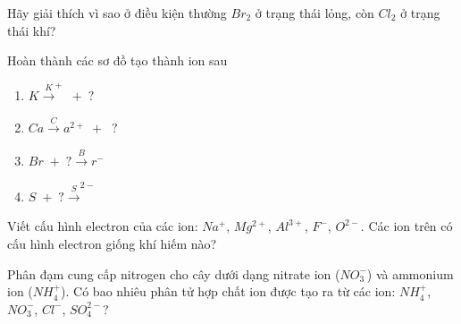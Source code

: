 \begin{bt}
	Hãy giải thích vì sao ở điều kiện thường $Br_2$ ở trạng thái lỏng, còn $Cl_2$ ở trạng thái khí?
\end{bt}
\begin{bt}
	Hoàn thành các sơ đồ tạo thành ion sau
	\begin{enumerate}
		\item $K \xrightarrow K^+ \; +\; ?$
		\item $Ca \xrightarrow Ca^{2+} \;+ \;\; ?$
		\item $Br \; + \;?\xrightarrow Br^-$
		\item $S \;+\; ?\xrightarrow S^{2-}$
	\end{enumerate}
\end{bt}
\begin{bt}
	Viết cấu hình electron của các ion: $Na^+$, $Mg^{2+}$, $Al^{3+}$, $F^-$, $O^{2-}$. Các ion trên có cấu hình electron giống khí hiếm nào?
\end{bt}
\begin{bt}
	Phân đạm cung cấp nitrogen cho cây dưới dạng nitrate ion ($NO_3^-$) và ammonium ion ($NH_4^+$). Có bao nhiêu phân tử hợp chất ion được tạo ra từ các ion: $NH_4^+$, $NO_3^-$, $Cl^-$, $SO_4^{2-}$?
\end{bt}
